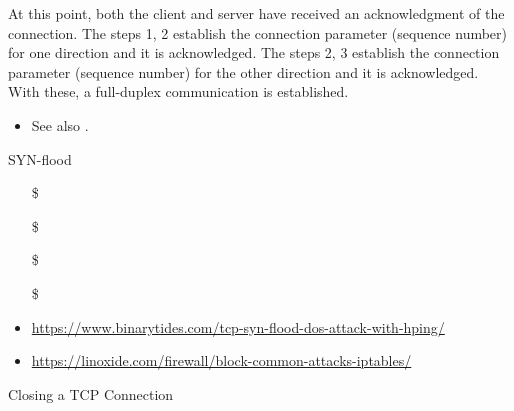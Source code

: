 At this point, both the client and server have received an acknowledgment of the
connection. The steps 1, 2 establish the connection parameter (sequence number) for one
direction and it is acknowledged. The steps 2, 3 establish the connection parameter
(sequence number) for the other direction and it is acknowledged. With these, a
full-duplex communication is established.

\begin{itemize}
\item See also .
\end{itemize}

\begin{frame}{SYN-flood}
  \begin{itemize}
  \item[\$] 
  \item[\$] 
  \item[\$] 
  \item[\$] 
  \end{itemize}
\end{frame}

\begin{itemize}
\item \url{https://www.binarytides.com/tcp-syn-flood-dos-attack-with-hping/}
\item \url{https://linoxide.com/firewall/block-common-attacks-iptables/}
\end{itemize}

\begin{frame}{Closing a TCP Connection}
  \begin{center}
  \end{center}
  \label{fig:3way-close}
\end{frame}

